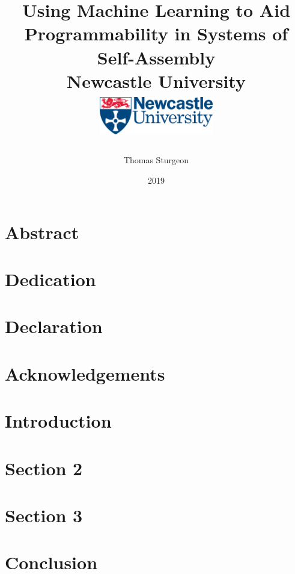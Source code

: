 \documentclass[12pt,twoside]{report}
\title{
{Using Machine Learning to Aid Programmability in Systems of Self-Assembly}\\
{\vspace{0.5cm}}
{\large Newcastle University}\\
{\vspace{2.5cm}}
{\includegraphics[width=5cm, height=2cm ]{newcastle.jpg}}
}
\author{Thomas Sturgeon}
\date{2019}
\begin{document}
\maketitle

\chapter*{Abstract}
 
\chapter*{Dedication}
 
\chapter*{Declaration}
 
\chapter*{Acknowledgements}
 

\tableofcontents

\chapter{Introduction}


\chapter{Section 2}


\chapter{Section 3}


\chapter{Conclusion}

\end{document}

